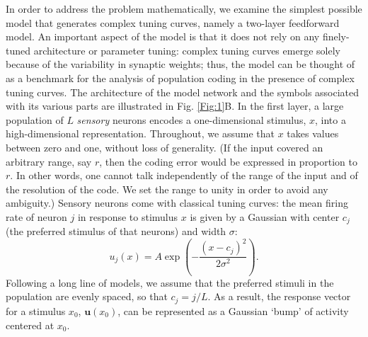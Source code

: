 \documentclass[a4paper]{article}%
\begin{document}
In order to address the problem mathematically, we examine the simplest
possible model that generates complex tuning curves, namely a two-layer
feedforward model. An important aspect of the model is that it does not rely
on any finely-tuned architecture or parameter tuning: complex tuning curves
emerge solely because of the variability in synaptic weights; thus, the model
can be thought of as a benchmark for the analysis of population coding in the
presence of complex tuning curves. The architecture of the model network and
the symbols associated with its various parts are illustrated in Fig.
\ref{Fig:1}B. In the first layer, a large population of $L$ \textit{sensory}
neurons encodes a one-dimensional stimulus, $x$, into a high-dimensional
representation. Throughout, we assume that $x$ takes values between zero and
one, without loss of generality. (If the input covered an arbitrary range, say
$r$, then the coding error would be expressed in proportion to $r$. In other
words, one cannot talk independently of the range of the input and of the
resolution of the code. We set the range to unity in order to avoid any
ambiguity.) Sensory neurons come with classical tuning curves: the mean firing
rate of neuron $j$ in response to stimulus $x$ is given by a Gaussian with
center $c_{j}$ (the preferred stimulus of that neurons) and width $\sigma$:
\begin{equation}
u_{j}\left(  x\right)  =A\exp\left(  -\frac{\left(  x-c_{j}\right)  ^{2}%
}{2\sigma^{2}}\right)  . \label{Eq:tuning-curve-layer1}%
\end{equation}
Following a long line of models, we assume that the preferred stimuli in the
population are evenly spaced, so that $c_{j}=j/L$. As a result, the response
vector for a stimulus $x_{0}$, $\mathbf{u}\left(  x_{0}\right)  $, can be
represented as a Gaussian `bump' of activity centered at $x_{0}$.
\end{document}
